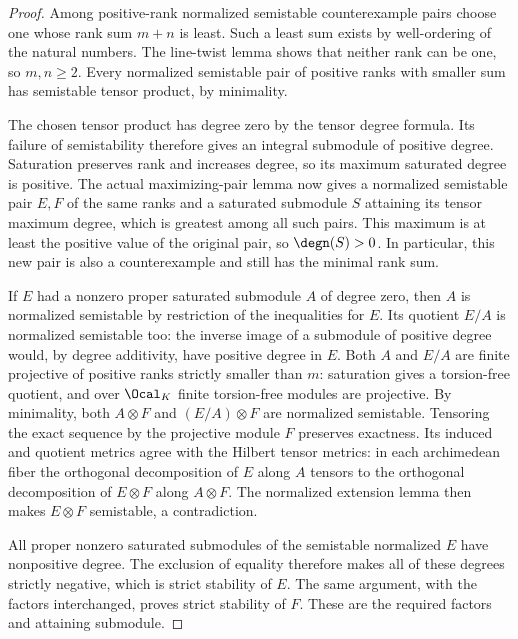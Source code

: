 \begin{proof}
Among positive-rank normalized semistable counterexample pairs choose
one whose rank sum $m+n$ is least. Such a least sum exists by
well-ordering of the natural numbers. The line-twist lemma shows
that neither rank can be one, so $m,n\geq2$. Every normalized
semistable pair of positive ranks with smaller sum has semistable
tensor product, by minimality.

The chosen tensor product has degree zero by the tensor degree formula.
Its failure of semistability therefore gives an integral submodule of
positive degree. Saturation preserves rank and increases degree,
so its maximum saturated degree is positive. The actual maximizing-pair
lemma now gives a normalized semistable pair $E,F$ of the same ranks
and a saturated submodule $S$ attaining its tensor maximum degree,
which is greatest among all such pairs. This maximum is at least
the positive value of the original pair, so $\degn(S)>0$.
In particular, this new pair is also a counterexample and still has
the minimal rank sum.

If $E$ had a nonzero proper saturated submodule $A$ of degree zero,
then $A$ is normalized semistable by restriction of the inequalities
for $E$. Its quotient $E/A$ is normalized semistable too: the inverse
image of a submodule of positive degree would, by degree additivity,
have positive degree in $E$. Both $A$ and $E/A$ are finite projective
of positive ranks strictly smaller than $m$: saturation gives a
torsion-free quotient, and over $\Ocal_K$ finite torsion-free modules
are projective. By minimality, both $A\otimes F$ and $(E/A)\otimes F$
are normalized semistable. Tensoring the exact sequence by the
projective module $F$ preserves exactness. Its induced and quotient
metrics agree with the Hilbert tensor metrics: in each archimedean
fiber the orthogonal decomposition of $E$ along $A$ tensors to the
orthogonal decomposition of $E\otimes F$ along $A\otimes F$.
The normalized extension lemma then makes $E\otimes F$ semistable,
a contradiction.

All proper nonzero saturated submodules of the semistable normalized
$E$ have nonpositive degree. The exclusion of equality therefore
makes all of these degrees strictly negative, which is strict
stability of $E$. The same argument, with the factors interchanged,
proves strict stability of $F$. These are the required factors and
attaining submodule.
\end{proof}
